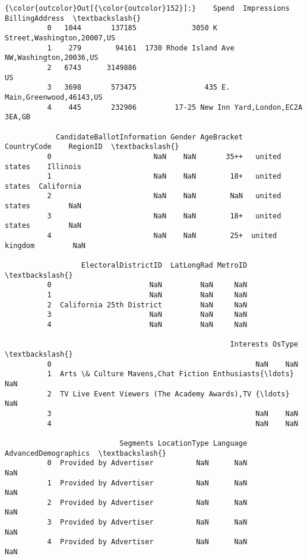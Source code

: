 \documentclass[11pt]{article}
\begin{document}
\begin{Verbatim}[commandchars=\\\{\}]
{\color{outcolor}Out[{\color{outcolor}152}]:}    Spend  Impressions                                BillingAddress  \textbackslash{}
          0   1044       137185             3050 K Street,Washington,20007,US   
          1    279        94161  1730 Rhode Island Ave NW,Washington,20036,US   
          2   6743      3149886                                            US   
          3   3698       573475                435 E. Main,Greenwood,46143,US   
          4    445       232906         17-25 New Inn Yard,London,EC2A 3EA,GB   
          
            CandidateBallotInformation Gender AgeBracket     CountryCode    RegionID  \textbackslash{}
          0                        NaN    NaN       35++   united states    Illinois   
          1                        NaN    NaN        18+   united states  California   
          2                        NaN    NaN        NaN   united states         NaN   
          3                        NaN    NaN        18+   united states         NaN   
          4                        NaN    NaN        25+  united kingdom         NaN   
          
                  ElectoralDistrictID  LatLongRad MetroID  \textbackslash{}
          0                       NaN         NaN     NaN   
          1                       NaN         NaN     NaN   
          2  California 25th District         NaN     NaN   
          3                       NaN         NaN     NaN   
          4                       NaN         NaN     NaN   
          
                                                     Interests OsType  \textbackslash{}
          0                                                NaN    NaN   
          1  Arts \& Culture Mavens,Chat Fiction Enthusiasts{\ldots}    NaN   
          2  TV Live Event Viewers (The Academy Awards),TV {\ldots}    NaN   
          3                                                NaN    NaN   
          4                                                NaN    NaN   
          
                           Segments LocationType Language AdvancedDemographics  \textbackslash{}
          0  Provided by Advertiser          NaN      NaN                  NaN   
          1  Provided by Advertiser          NaN      NaN                  NaN   
          2  Provided by Advertiser          NaN      NaN                  NaN   
          3  Provided by Advertiser          NaN      NaN                  NaN   
          4  Provided by Advertiser          NaN      NaN                  NaN   
          

\end{Verbatim}
\end{document}
